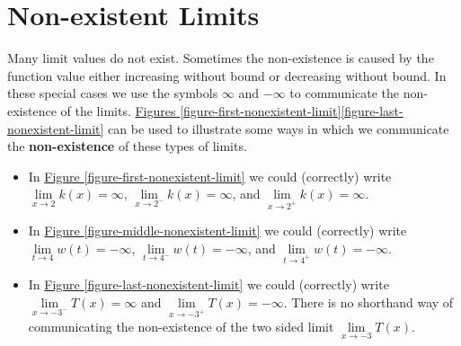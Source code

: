 \documentclass[12pt,]{book}
\newcommand{\terminology}[1]{\textbf{#1}}
\theoremstyle{plain}
\theoremstyle{definition}
\numberwithin{equation}{section}
\newcommand{\fe}[2]{#1\mathopen{}\left(#2\right)\mathclose{}}
\begin{document}
\section[Non-existent Limits]{Non-existent Limits}\label{section-nonexistent-limits}
Many limit values do not exist. Sometimes the non-existence is caused by the function value either increasing without bound or decreasing without bound. In these special cases we use the symbols \(\infty\) and \(-\infty\) to communicate the non-existence of the limits. \hyperref[figure-first-nonexistent-limit]{Figures \ref{figure-first-nonexistent-limit}}\textendash{}\hyperref[figure-last-nonexistent-limit]{\ref{figure-last-nonexistent-limit}} can be used to illustrate some ways in which we communicate the \terminology{non-existence} of these types of limits.%
\begin{itemize}[label=\textbullet]
\item{}In \hyperref[figure-first-nonexistent-limit]{Figure \ref{figure-first-nonexistent-limit}} we could (correctly) write\newline{}\(\lim\limits_{x\to2}\fe{k}{x}=\infty\), \(\lim\limits_{x\to2^{-}}\fe{k}{x}=\infty\), and \(\lim\limits_{x\to2^{+}}\fe{k}{x}=\infty\).\item{}In \hyperref[figure-middle-nonexistent-limit]{Figure \ref{figure-middle-nonexistent-limit}} we could (correctly) write\newline{}\(\lim\limits_{t\to4}\fe{w}{t}=-\infty\), \(\lim\limits_{t\to4^{-}}\fe{w}{t}=-\infty\), and \(\lim\limits_{t\to4^{+}}\fe{w}{t}=-\infty\).\item{}In \hyperref[figure-last-nonexistent-limit]{Figure \ref{figure-last-nonexistent-limit}} we could (correctly) write\newline{}\(\lim\limits_{x\to-3^{-}}\fe{T}{x}=\infty\) and \(\lim\limits_{x\to-3^{+}}\fe{T}{x}=-\infty\).\newline{} There is no shorthand way of communicating the non-existence of the two sided limit \(\lim\limits_{x\to-3}\fe{T}{x}\).\end{itemize}
\end{document}
